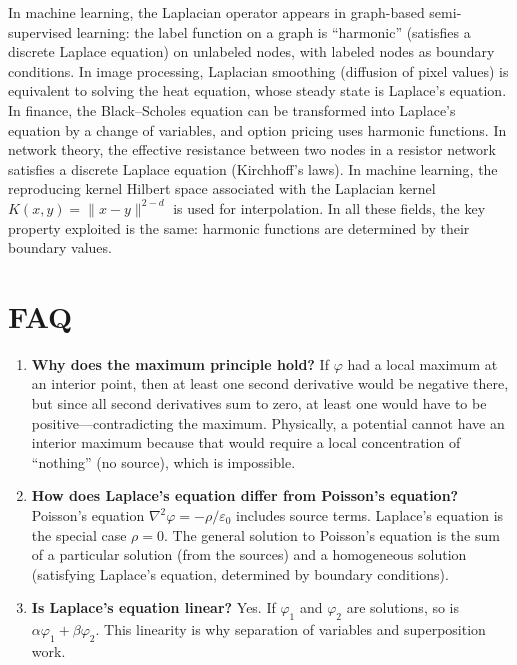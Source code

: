 \documentclass[11pt,openright]{book}
\begin{document}
In machine learning, the Laplacian operator appears in graph-based semi-supervised learning: the label function on a graph is ``harmonic'' (satisfies a discrete Laplace equation) on unlabeled nodes, with labeled nodes as boundary conditions. In image processing, Laplacian smoothing (diffusion of pixel values) is equivalent to solving the heat equation, whose steady state is Laplace's equation. In finance, the Black--Scholes equation can be transformed into Laplace's equation by a change of variables, and option pricing uses harmonic functions. In network theory, the effective resistance between two nodes in a resistor network satisfies a discrete Laplace equation (Kirchhoff's laws). In machine learning, the reproducing kernel Hilbert space associated with the Laplacian kernel $K(x,y) = \|x-y\|^{2-d}$ is used for interpolation. In all these fields, the key property exploited is the same: harmonic functions are determined by their boundary values.



\section*{FAQ}

\begin{enumerate}
\item \textbf{Why does the maximum principle hold?}
If $\varphi$ had a local maximum at an interior point, then at least one second derivative would be negative there, but since all second derivatives sum to zero, at least one would have to be positive---contradicting the maximum. Physically, a potential cannot have an interior maximum because that would require a local concentration of ``nothing'' (no source), which is impossible.

\item \textbf{How does Laplace's equation differ from Poisson's equation?}
Poisson's equation $\nabla^{2}\varphi = -\rho/\varepsilon_{0}$ includes source terms. Laplace's equation is the special case $\rho = 0$. The general solution to Poisson's equation is the sum of a particular solution (from the sources) and a homogeneous solution (satisfying Laplace's equation, determined by boundary conditions).

\item \textbf{Is Laplace's equation linear?}
Yes. If $\varphi_{1}$ and $\varphi_{2}$ are solutions, so is $\alpha\varphi_{1} + \beta\varphi_{2}$. This linearity is why separation of variables and superposition work.
\end{enumerate}
\end{document}
